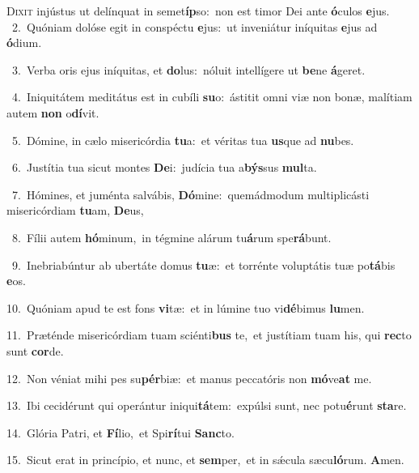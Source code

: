 \lettrine{\initial\textcolor{\initialcolor}{D}}{ixit} injústus ut delínquat in semet\-\textbf{íp}\-so:~\star non est timor Dei ante \textbf{ó}\-culos \textbf{e}\-jus.\\
{\numbfont\textcolor{\numbcolor}{~2.}}~Quóniam dolóse egit in conspéctu \textbf{e}\-jus:~\star ut inveniátur iníquitas \textbf{e}\-jus ad \textbf{ó}\-dium.\par
{\numbfont\textcolor{\numbcolor}{~3.}}~Verba oris ejus iníquitas, et \textbf{do}\-lus:~\star nóluit intellígere ut \textbf{be}\-ne \textbf{á}\-geret.\par
{\numbfont\textcolor{\numbcolor}{~4.}}~Iniquitátem meditátus est in cubíli \textbf{su}\-o:~\star ástitit omni viæ non bonæ, malítiam autem \textbf{non} o\-\textbf{dí}\-vit.\par
{\numbfont\textcolor{\numbcolor}{~5.}}~Dómine, in cælo misericórdia \textbf{tu}\-a:~\star et véritas tua \textbf{us}\-que ad \textbf{nu}\-bes.\par
{\numbfont\textcolor{\numbcolor}{~6.}}~Justítia tua sicut montes \textbf{De}\-i:~\star judícia tua a\-\textbf{býs}\-sus \textbf{mul}\-ta.\par
{\numbfont\textcolor{\numbcolor}{~7.}}~Hómines, et juménta salvábis, \textbf{Dó}\-mine:~\star quemádmodum multiplicásti misericórdiam \textbf{tu}\-am, \textbf{De}\-us,\par
{\numbfont\textcolor{\numbcolor}{~8.}}~Fílii autem \textbf{hó}\-minum,~\star in tégmine alárum tu\-\textbf{á}\-rum spe\-\textbf{rá}\-bunt.\par
{\numbfont\textcolor{\numbcolor}{~9.}}~Inebriabúntur ab ubertáte domus \textbf{tu}\-æ:~\star et torrénte voluptátis tuæ po\-\textbf{tá}\-bis \textbf{e}\-os.\par
{\numbfont\textcolor{\numbcolor}{10.}}~Quóniam apud te est fons \textbf{vi}\-tæ:~\star et in lúmine tuo vi\-\textbf{dé}\-bimus \textbf{lu}\-men.\par
{\numbfont\textcolor{\numbcolor}{11.}}~Præténde misericórdiam tuam sciénti\textbf{bus} te,~\star et justítiam tuam his, qui \textbf{rec}\-to sunt \textbf{cor}\-de.\par
{\numbfont\textcolor{\numbcolor}{12.}}~Non véniat mihi pes su\-\textbf{pér}\-biæ:~\star et manus peccatóris non \textbf{mó}\-ve\textbf{at} me.\par
{\numbfont\textcolor{\numbcolor}{13.}}~Ibi cecidérunt qui operántur iniqui\-\textbf{tá}\-tem:~\star expúlsi sunt, nec potu\-\textbf{é}\-runt \textbf{sta}\-re.\par
{\numbfont\textcolor{\numbcolor}{14.}}~Glória Patri, et \textbf{Fí}\-lio,~\star et Spi\-\textbf{rí}\-tui \textbf{Sanc}\-to.\par
{\numbfont\textcolor{\numbcolor}{15.}}~Sicut erat in princípio, et nunc, et \textbf{sem}\-per,~\star et in sǽcula sæcu\-\textbf{ló}\-rum. \textbf{A}\-men.\par
